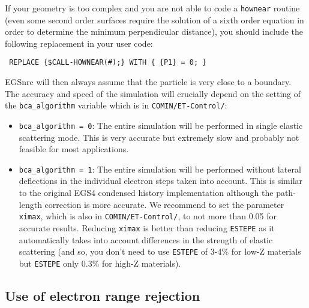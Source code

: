 If your geometry is too complex and you are not
able to code a {\tt hownear} routine (even some
second order surfaces require the solution of
a sixth order equation in order to determine the
minimum perpendicular distance), you should include the
following replacement in your user code:
\begin{flushleft}{\tt
REPLACE \{\$CALL-HOWNEAR(\#);\} WITH \{ \{P1\} = 0; \} }
\end{flushleft}
EGSnrc will then always assume that the particle is very
close to a boundary. The accuracy and speed of the simulation
will crucially
depend on the setting of the {\tt bca\_algorithm} variable
which is in {\tt COMIN/ET-Control/}:
\begin{itemize}
\item
{\tt bca\_algorithm = 0}: The entire simulation will be
performed in single elastic scattering mode. This is
very accurate but extremely slow and probably not feasible
for most applications.
\item
{\tt bca\_algorithm = 1}: The entire simulation will
be performed without lateral deflections in the individual
electron steps taken into account. This is similar to the
original EGS4 condensed history implementation although
the path-length correction is more accurate. We recommend
to set the parameter {\tt ximax}, which is also in
{\tt COMIN/ET-Control/}, to not more than 0.05 for accurate
results. Reducing {\tt ximax} is better than reducing
{\tt ESTEPE} as it automatically takes into account
differences in the strength of elastic scattering
(and so, you don't need to use {\tt ESTEPE} of 3-4\%
for low-Z materials but {\tt ESTEPE} only 0.3\% for
high-Z materials).
\end{itemize}

\subsection{Use of electron range rejection}
\label{range_change}



